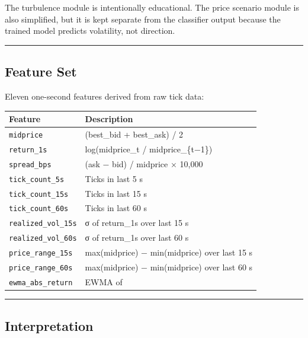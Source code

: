\documentclass[
]{article}
\begin{document}
The turbulence module is intentionally educational. The price scenario
module is also simplified, but it is kept separate from the classifier
output because the trained model predicts volatility, not direction.

\begin{center}\rule{0.5\linewidth}{0.5pt}\end{center}

\hypertarget{feature-set}{%
\subsection{Feature Set}\label{feature-set}}

Eleven one-second features derived from raw tick data:

\begin{longtable}[]{@{}ll@{}}
\toprule
Feature & Description \\
\midrule
\endhead
\texttt{midprice} & (best\_bid + best\_ask) / 2 \\
\texttt{return\_1s} & log(midprice\_t / midprice\_\{t−1\}) \\
\texttt{spread\_bps} & (ask − bid) / midprice × 10,000 \\
\texttt{tick\_count\_5s} & Ticks in last 5 s \\
\texttt{tick\_count\_15s} & Ticks in last 15 s \\
\texttt{tick\_count\_60s} & Ticks in last 60 s \\
\texttt{realized\_vol\_15s} & σ of return\_1s over last 15 s \\
\texttt{realized\_vol\_60s} & σ of return\_1s over last 60 s \\
\texttt{price\_range\_15s} & max(midprice) − min(midprice) over last 15
s \\
\texttt{price\_range\_60s} & max(midprice) − min(midprice) over last 60
s \\
\texttt{ewma\_abs\_return} & EWMA of \\
\bottomrule
\end{longtable}

\begin{center}\rule{0.5\linewidth}{0.5pt}\end{center}

\hypertarget{interpretation}{%
\subsection{Interpretation}\label{interpretation}}
\end{document}

